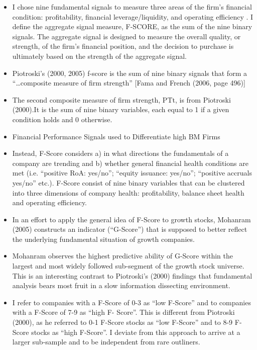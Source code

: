 \documentclass[12pt]{article}
\begin{document}
        \begin{itemize}

            \item I chose nine fundamental signals to measure three areas of the firm's financial condition: profitability, financial leverage/liquidity, and operating efficiency \citep{Piotroski2000}. I define the aggregate signal measure, F-SCORE, as the sum of the nine binary signals. The aggregate signal is designed to measure the overall quality, or strength, of the firm's financial position, and the decision to purchase is ultimately based on the strength of the aggregate signal.

            \item Piotroski’s (2000, 2005) f-score is the sum of nine binary signals that form a “…composite measure of firm strength” [Fama and French (2006, page 496)] \citep{Choi2012}

            \item The second composite measure of firm strength, PTt, is from Piotroski (2000).It is the sum of nine binary variables, each equal to 1 if a given condition holds and 0 otherwise.\citep{Fama2006}

            \item Financial Performance Signals used to Differentiate high BM Firms \citep{Piotroski2000}

            \item Instead, F-Score considers a) in what directions the fundamentals of a company are trending and b) whether general financial health conditions are met (i.e. “positive RoA: yes/no”; “equity issuance: yes/no”; “positive accruals yes/no” etc.). F-Score consist of nine binary variables that can be clustered into three dimensions of company health: profitability, balance sheet health and operating efficiency.\citep{Mohr2012}
        
            \item In an effort to apply the general idea of F-Score to growth stocks, Mohanram (2005) constructs an indicator (“G-Score”) that is supposed to better reflect the underlying fundamental situation of growth companies. \citep{Mohr2012}

            \item Mohanram observes the highest predictive ability of G-Score within the largest and most widely followed sub-segment of the growth stock universe. This is an interesting contrast to Piotroski’s (2000) findings that fundamental analysis bears most fruit in a slow information dissecting environment. \citep{Mohr2012}

            \item I refer to companies with a F-Score of 0-3 as “low F-Score” and to companies with a F-Score of 7-9 as “high F- Score”. This is different from Piotroski (2000), as he referred to 0-1 F-Score stocks as “low F-Score” and to 8-9 F-Score stocks as “high F-Score”. I deviate from this approach to arrive at a larger sub-sample and to be independent from rare outliners. \citep{Mohr2012}


        \end{itemize}
\end{document}
